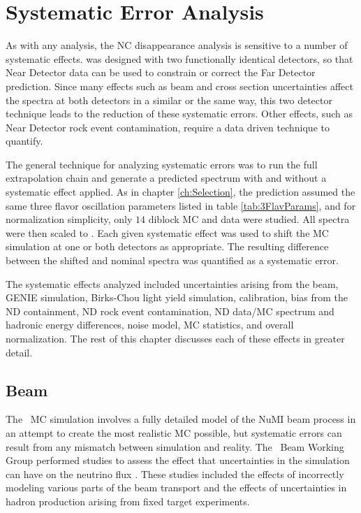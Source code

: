 \chapter{Systematic Error Analysis}
\label{ch:Systs}

As with any analysis, the NC disappearance analysis is sensitive to a number of systematic effects. \nova\newline\n was designed with two functionally identical detectors, so that Near Detector data can be used to constrain or correct the Far Detector prediction. Since many effects such as beam and cross section uncertainties affect the spectra at both detectors in a similar or the same way, this two detector technique leads to the reduction of these systematic errors. Other effects, such as Near Detector rock event contamination, require a data driven technique to quantify.

The general technique for analyzing systematic errors was to run the full extrapolation chain and generate a predicted spectrum with and without a systematic effect applied. As in chapter \ref{ch:Selection}, the prediction assumed the same three flavor oscillation parameters listed in table \ref{tab:3FlavParams}, and for normalization simplicity, only $14$ diblock MC and data were studied. All spectra were then scaled to . Each given systematic effect was used to shift the MC simulation at one or both detectors as appropriate. The resulting difference between the shifted and nominal spectra was quantified as a systematic error.

The systematic effects analyzed included uncertainties arising from the beam, GENIE simulation, Birks-Chou light yield simulation, calibration, bias from the ND containment, ND rock event contamination, ND data/MC spectrum and hadronic energy differences, noise model, MC statistics, and overall normalization. The rest of this chapter discusses each of these effects in greater detail.

\section{Beam}
\label{sec:SystBeam}

The \nova~MC simulation involves a fully detailed model of the NuMI beam process in an attempt to create the most realistic MC possible, but systematic errors can result from any mismatch between simulation and reality. The \nova~Beam Working Group performed studies to assess the effect that uncertainties in the simulation can have on the neutrino flux \cite{ref:TNBeam}. These studies included the effects of incorrectly modeling various parts of the beam transport and the effects of uncertainties in hadron production arising from fixed target experiments.

